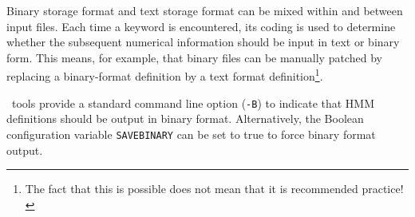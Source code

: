 Binary storage format and text storage format can be mixed
within and between input files.  Each time a keyword is
encountered, its coding is used to determine whether the
subsequent numerical information should be input in text
or binary form.  This means, for example, that binary
files can be manually patched by replacing a binary-format
definition by a text format definition\footnote{The fact that
this is possible does not mean that it is recommended practice!}.

\HTK\ tools provide a standard command line option (\texttt{-B}) to indicate
that HMM definitions should be output in binary format.
Alternatively, the Boolean configuration 
variable \texttt{SAVEBINARY} can be set to true to
force binary format output.


